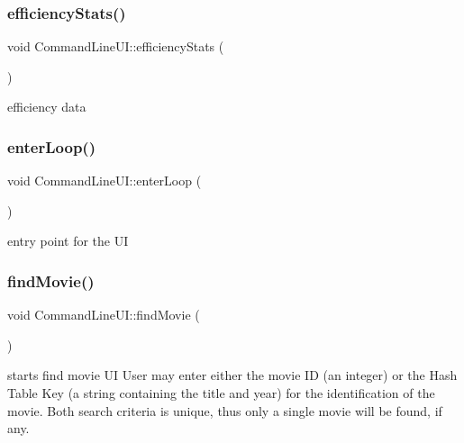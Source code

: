 \subsubsection{\texorpdfstring{efficiency\+Stats()}{efficiencyStats()}}
{\footnotesize\ttfamily void Command\+Line\+U\+I\+::efficiency\+Stats (\begin{DoxyParamCaption}{ }\end{DoxyParamCaption})\hspace{0.3cm}{\ttfamily [static]}}

efficiency data \mbox{\label{class_command_line_u_i_ac72a09121b78bdf1ab1f457795fcf370}} 
\subsubsection{\texorpdfstring{enter\+Loop()}{enterLoop()}}
{\footnotesize\ttfamily void Command\+Line\+U\+I\+::enter\+Loop (\begin{DoxyParamCaption}{ }\end{DoxyParamCaption})\hspace{0.3cm}{\ttfamily [static]}}

entry point for the UI \mbox{\label{class_command_line_u_i_ae65ad2e8c5172594370fbeea8c5f825d}} 
\subsubsection{\texorpdfstring{find\+Movie()}{findMovie()}}
{\footnotesize\ttfamily void Command\+Line\+U\+I\+::find\+Movie (\begin{DoxyParamCaption}{ }\end{DoxyParamCaption})\hspace{0.3cm}{\ttfamily [static]}}

starts find movie UI User may enter either the movie ID (an integer) or the Hash Table Key (a string containing the title and year) for the identification of the movie. Both search criteria is unique, thus only a single movie will be found, if any. \mbox{\label{class_command_line_u_i_af57bcb2a7cb037743b1a936f308f2c85}} 
